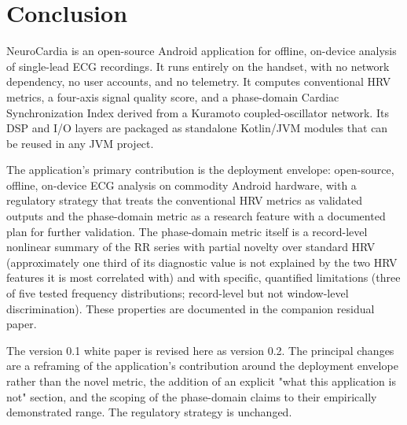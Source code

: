 \documentclass[11pt]{article}
\begin{document}
\section{Conclusion}

NeuroCardia is an open-source Android application for offline,
on-device analysis of single-lead ECG recordings. It runs entirely on
the handset, with no network dependency, no user accounts, and no
telemetry. It computes conventional HRV metrics, a four-axis signal
quality score, and a phase-domain Cardiac Synchronization Index derived
from a Kuramoto coupled-oscillator network. Its DSP and I/O layers are
packaged as standalone Kotlin/JVM modules that can be reused in any JVM
project.

The application's primary contribution is the deployment envelope:
open-source, offline, on-device ECG analysis on commodity Android
hardware, with a regulatory strategy that treats the conventional HRV
metrics as validated outputs and the phase-domain metric as a research
feature with a documented plan for further validation. The
phase-domain metric itself is a record-level nonlinear summary of the
RR series with partial novelty over standard HRV (approximately one
third of its diagnostic value is not explained by the two HRV features
it is most correlated with) and with specific, quantified limitations
(three of five tested frequency distributions; record-level but not
window-level discrimination). These properties are documented in the
companion residual paper.

The version 0.1 white paper is revised here as version 0.2. The
principal changes are a reframing of the application's contribution
around the deployment envelope rather than the novel metric, the
addition of an explicit "what this application is not" section, and
the scoping of the phase-domain claims to their empirically
demonstrated range. The regulatory strategy is unchanged.
\end{document}
